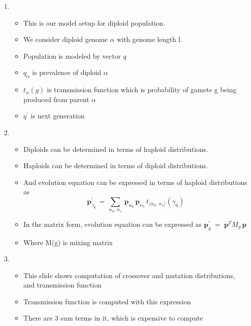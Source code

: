 \documentclass{article}
\begin{document}
\begin{enumerate}
\item
  \begin{itemize}
  \item This is our model setup for diploid population.
  \item We consider diploid genome $\alpha$ with genome length l.
  \item Population is modeled by vector $q$
  \item $q_\alpha$ is prevalence of diploid $\alpha$
  \item $t_{\alpha}(g)$ is transmission function which is probability
    of gamete g being produced from parent $\alpha$
  \item $q^\prime$ is next generation
  \end{itemize}
    
\item
  \begin{itemize}
  \item Diploids can be determined in terms of haploid
    distributions.
  \item Haploids can be determined in terms of diploid
    distributions.
  \item And evolution equation can be expressed in terms of haploid
    distributions as 
    \[\bm{p}_{\gamma_0}^{\prime} \,=\, \sum_{\alpha_0, \, \alpha_1} \, \bm{p}_{\alpha_0} \, \bm{p}_{\alpha_1} \,
	  t_{\langle \alpha_0, \,\alpha_1 \rangle}(\gamma_0) \]
	  
  \item In the matrix form, evolution equation can be expressed as $\bm{p}_g^\prime \; = \; \bm{p}^T M_g \, \bm{p}$
  \item Where M(g) is mixing matrix
  \end{itemize}
    
\item
  \begin{itemize}
  \item This slide shows computation of crossover and mutation
    distributions, and transmission function  
  \item Transmission function is computed with this expression
  \item There are 3 sum terms in it, which is expensive to compute
  \end{itemize}
    

\end{enumerate}
\end{document}

